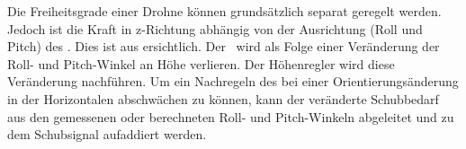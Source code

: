 




Die Freiheitsgrade einer Drohne können grundsätzlich separat geregelt werden.
Jedoch ist die Kraft in z-Richtung abhängig von der Ausrichtung (Roll und Pitch) des \Quad[s]. Dies ist aus  ersichtlich. Der \Quad\ wird als Folge einer Veränderung der Roll- und Pitch-Winkel an Höhe verlieren. Der Höhenregler wird diese Veränderung nachführen.
Um ein Nachregeln des \Quad[s] bei einer Orientierungsänderung in der Horizontalen abschwächen zu können, kann der veränderte Schubbedarf aus den gemessenen oder berechneten Roll- und Pitch-Winkeln abgeleitet und zu dem Schubsignal aufaddiert werden.


